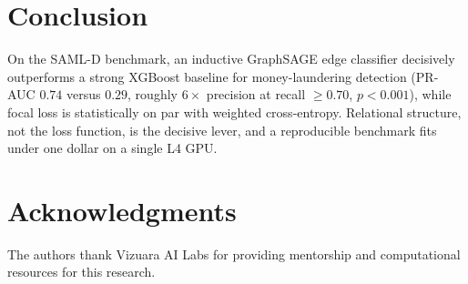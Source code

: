 \documentclass[conference]{IEEEtran}
\begin{document}
\section{Conclusion}
On the SAML-D benchmark, an inductive GraphSAGE edge classifier decisively outperforms a strong XGBoost
baseline for money-laundering detection (PR-AUC $0.74$ versus $0.29$, roughly $6\times$ precision at recall
$\geq 0.70$, $p < 0.001$), while focal loss is statistically on par with weighted cross-entropy. Relational
structure, not the loss function, is the decisive lever, and a reproducible benchmark fits under one dollar
on a single L4 GPU.

\section*{Acknowledgments}
The authors thank Vizuara AI Labs for providing mentorship and computational resources for this research.
\end{document}
